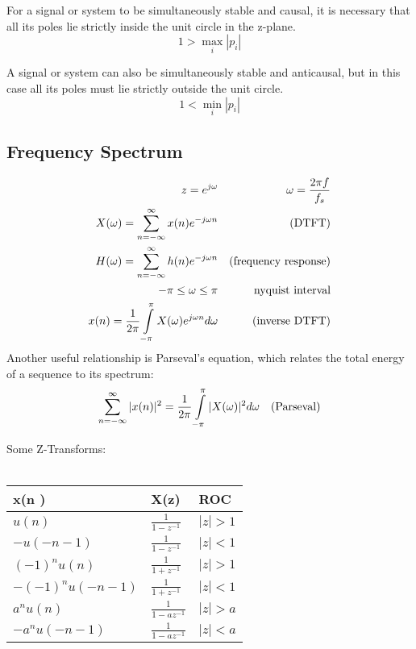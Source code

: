 For a signal or system to be simultaneously stable and causal, it is necessary that all its poles lie strictly inside the unit circle in the z-plane. 
\[ 1 > \max\limits_{i}|p_i| \]

A signal or system
can also be simultaneously stable and anticausal, but in this case all its poles must lie
strictly outside the unit circle.
\[ 1 < \min\limits_{i}|p_i| \]

\subsection{Frequency Spectrum}
\begin{align}
z=e^{j\omega} && \omega = \frac{2 \pi f}{f_s} \notag\\
X(\omega)= \sum\limits_{n=-\infty}^{\infty} x(n)e^{-j\omega n} &&  \text{(DTFT)} \notag \\
H(\omega)= \sum\limits_{n=-\infty}^{\infty} h(n)e^{-j\omega n} &&  \text{(frequency response)} \notag \\
 -\pi \leq \omega \leq \pi && \text{nyquist interval}\notag\\
x(n)= \frac{1}{2\pi} \int\limits_{-\pi}^{\pi} X(\omega)e^{j\omega n} d\omega &&\text{(inverse DTFT)} \notag
\end{align}
Another useful relationship is Parseval’s equation, which relates the total energy of a sequence to its spectrum: 
\begin{align}
\sum_{n=-\infty}^{\infty} |x(n)|^2= \frac{1}{2\pi} \int\limits_{-\pi}^{\pi} |X(\omega)|^2 d\omega && \text{(Parseval)} \notag
\end{align}

Some Z-Transforms: \\ \\
\begin{tabularx}{0.6\textwidth}{|X|X|X|}
	\hline
	\textbf{x(n} ) & \textbf{X(z}) & \textbf{ROC} \\
	\hline
	$u(n)$ & $\frac{1}{1 - z^{-1}}$ & $|z|>1$ \\
	\hline
	$-u(-n-1)$ & $\frac{1}{1 - z^{-1}}$ & $|z|<1$ \\
	\hline
	$(-1)^n u(n)$ & $\frac{1}{1 + z^{-1}}$ & $|z|>1$ \\
	\hline
	$-(-1)^n u(-n-1)$ & $\frac{1}{1 + z^{-1}}$ & $|z|<1$ \\
	\hline
	$a^n u(n)$ & $\frac{1}{1 - az^{-1}}$ & $|z|>a$ \\
	\hline
	$-a^n u(-n-1)$ & $\frac{1}{1 - az^{-1}}$ & $|z|<a$ \\
	\hline
\end{tabularx}\\ \\
